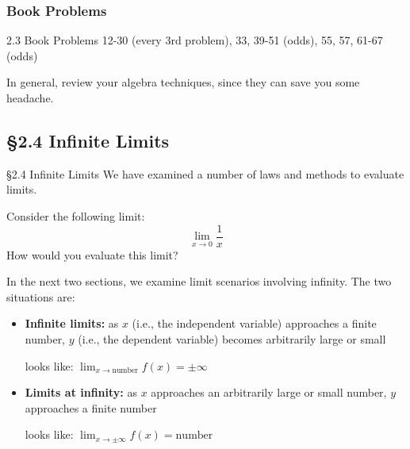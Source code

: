 \documentclass[cal1spr16Lectures.tex]{subfiles}
\begin{document}
\subsubsection{Book Problems}
\begin{frame}
\begin{block}{2.3 Book Problems} 12-30 (every 3rd problem), 33, 39-51 (odds), 55, 57, 61-67 (odds) \end{block}
In general, review your algebra techniques, since they can save you some headache.
\end{frame}

\subsection[2.4 Infinite Limits]{\S 2.4 Infinite Limits}

\begin{frame}{\S 2.4 Infinite Limits}
We have examined a number of laws and methods to evaluate limits.  
\begin{que}
Consider the following limit: 
\[
\lim_{x\to 0}\frac{1}{x}
\]
How would you evaluate this limit?
\end{que}
\end{frame}

\begin{frame}{}\footnotesize
In the next two sections, we examine limit scenarios involving infinity.  The two situations are:
\begin{itemize}
\item {\bf Infinite limits:}  as $x$ (i.e., the independent variable) approaches a finite number, $y$ (i.e., the dependent variable) becomes arbitrarily large or small

\vspace{0.5pc}
\hspace{50pt}looks like: $\displaystyle\lim_{x\to\text{number}}f(x)=\pm\infty$
\item {\bf Limits at infinity:} as $x$ approaches an arbitrarily large or small number, $y$ approaches a finite number

\vspace{0.5pc}
\hspace{50pt}looks like: $\displaystyle\lim_{x\to\pm\infty}f(x)=\text{number}$
\end{itemize}
\end{frame}
\end{document}
